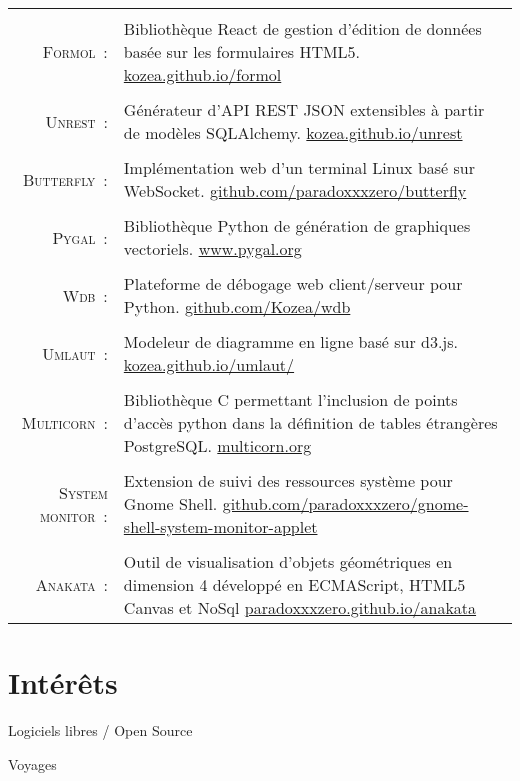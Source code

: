 \documentclass[a4paper,10pt]{article}
\begin{document}
\begin{tabular}{r|p{11cm}}
  \multicolumn{2}{c}{} \\
  \textsc{Formol :} & Bibliothèque React de gestion d’édition de données basée sur les formulaires HTML5. \href{https://kozea.github.io/formol/}{kozea.github.io/formol} \\

  \multicolumn{2}{c}{} \\
  \textsc{Unrest :} & Générateur d'API REST JSON extensibles à partir de modèles SQLAlchemy. \href{https://kozea.github.io/unrest/}{kozea.github.io/unrest} \\

  \multicolumn{2}{c}{} \\
  \textsc{Butterfly :} & Implémentation web d'un terminal Linux basé sur WebSocket. \href{https://github.com/paradoxxxzero/butterfly}{github.com/paradoxxxzero/butterfly} \\

  \multicolumn{2}{c}{} \\
  \textsc{Pygal :} & Bibliothèque Python de génération de graphiques vectoriels. \href{http://www.pygal.org/}{www.pygal.org} \\

  \multicolumn{2}{c}{} \\
  \textsc{Wdb :} & Plateforme de débogage web client/serveur pour Python. \href{https://github.com/Kozea/wdb}{github.com/Kozea/wdb} \\

  \multicolumn{2}{c}{} \\
  \textsc{Umlaut :} & Modeleur de diagramme en ligne basé sur d3.js. \href{http://kozea.github.io/umlaut/}{kozea.github.io/umlaut/} \\

  \multicolumn{2}{c}{} \\
  \textsc{Multicorn :} & Bibliothèque C permettant l’inclusion de points d'accès python dans la définition de tables étrangères PostgreSQL. \href{https://multicorn.org/}{multicorn.org} \\

  \multicolumn{2}{c}{} \\
  \textsc{System monitor :} & Extension de suivi des ressources système pour Gnome Shell. \href{https://github.com/paradoxxxzero/gnome-shell-system-monitor-applet}{github.com/paradoxxxzero/gnome-shell-system-monitor-applet} \\

  \multicolumn{2}{c}{} \\
  \textsc{Anakata :} & Outil de visualisation d’objets géométriques en dimension 4 développé en ECMAScript, HTML5 Canvas et NoSql \href{http://paradoxxxzero.github.io/anakata/}{paradoxxxzero.github.io/anakata} \\
\end{tabular}

\section{Intérêts}
  \par{Logiciels libres / Open Source}
  \par{Voyages}
\end{document}
